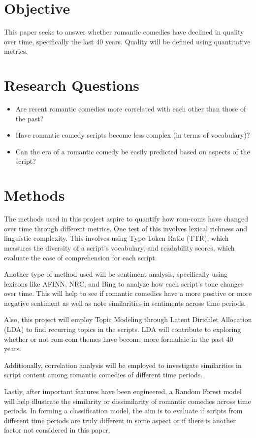 \documentclass[
  authoryear,
  preprint]{elsarticle}
\providecommand{\tightlist}{%
  \setlength{\itemsep}{0pt}\setlength{\parskip}{0pt}}\usepackage{longtable,booktabs,array}
\begin{document}
\section{Objective}\label{objective}

This paper seeks to answer whether romantic comedies have declined in
quality over time, specifically the last 40 years. Quality will be
defined using quantitative metrics.

\section{Research Questions}\label{research-questions}

\begin{itemize}
\tightlist
\item
  Are recent romantic comedies more correlated with each other than
  those of the past?
\item
  Have romantic comedy scripts become less complex (in terms of
  vocabulary)?
\item
  Can the era of a romantic comedy be easily predicted based on aspects
  of the script?
\end{itemize}

\section{Methods}\label{methods}

The methods used in this project aspire to quantify how rom-coms have
changed over time through different metrics. One test of this involves
lexical richness and linguistic complexity. This involves using
Type-Token Ratio (TTR), which measures the diversity of a script's
vocabulary, and readability scores, which evaluate the ease of
comprehension for each script.

Another type of method used will be sentiment analysis, specifically
using lexicons like AFINN, NRC, and Bing to analyze how each script's
tone changes over time. This will help to see if romantic comedies have
a more positive or more negative sentiment as well as note similarities
in sentiments across time periods.

Also, this project will employ Topic Modeling through Latent Dirichlet
Allocation (LDA) to find recurring topics in the scripts. LDA will
contribute to exploring whether or not rom-com themes have become more
formulaic in the past 40 years.

Additionally, correlation analysis will be employed to investigate
similarities in script content among romantic comedies of different time
periods.

Lastly, after important features have been engineered, a Random Forest
model will help illustrate the similarity or dissimilarity of romantic
comedies across time periods. In forming a classification model, the aim
is to evaluate if scripts from different time periods are truly
different in some aspect or if there is another factor not considered in
this paper.
\end{document}
